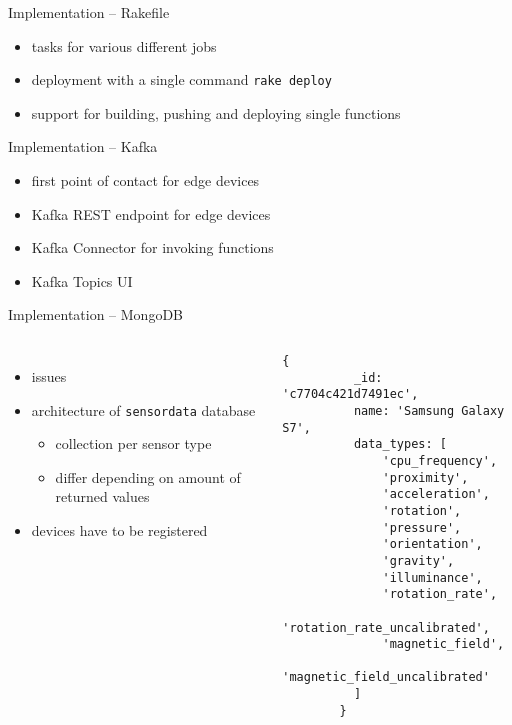 \begin{frame}{Implementation -- Rakefile}
  \begin{itemize}
    \item tasks for various different jobs
    \item deployment with a single command \lstinline{rake deploy}
    \item support for building, pushing and deploying single functions
  \end{itemize}
\end{frame}

\begin{frame}{Implementation -- Kafka}
  \begin{itemize}
    \item first point of contact for edge devices
    \item Kafka REST endpoint for edge devices
    \item Kafka Connector for invoking functions
    \item Kafka Topics UI
  \end{itemize}
\end{frame}

\begin{frame}[fragile]{Implementation -- MongoDB}
  \begin{columns}
      \begin{itemize}
        \item issues
        \item architecture of \texttt{sensordata} database
          \begin{itemize}
            \item collection per sensor type
            \item differ depending on amount of returned values
          \end{itemize}
        \item devices have to be registered
      \end{itemize}
        \begin{lstlisting}[language=mongo, basicstyle=\scriptsize\ttfamily]
        {
          _id: 'c7704c421d7491ec',
          name: 'Samsung Galaxy S7',
          data_types: [
              'cpu_frequency',
              'proximity',
              'acceleration',
              'rotation',
              'pressure',
              'orientation',
              'gravity',
              'illuminance',
              'rotation_rate',
              'rotation_rate_uncalibrated',
              'magnetic_field',
              'magnetic_field_uncalibrated'
          ]
        }
        \end{lstlisting}
   \end{columns}
\end{frame}


